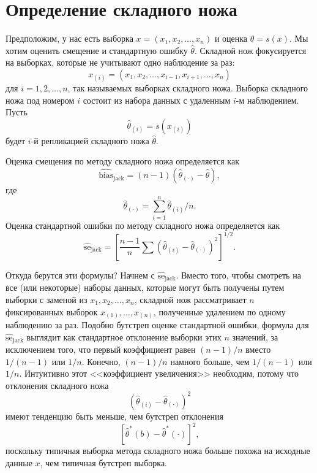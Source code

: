 \section{Определение складного ножа}

Предположим, у нас есть выборка $x = (x_1, x_2, \dots, x_n)$ и оценка $\hat{\theta} = s(x)$. Мы хотим оценить смещение и стандартную ошибку $\hat{\theta}$. Складной нож фокусируется на выборках, которые не учитывают одно наблюдение за раз:
\begin{equation}\label{eq11.1}
    x_{(i)} = (x_1, x_2, \dots, x_{i-1}, x_{i+1}, \dots, x_n)
\end{equation}
для $i = 1, 2, \dots, n$, так называемых выборках складного ножа. Выборка складного ножа под номером $i$ состоит из набора данных с удаленным $i$-м наблюдением. Пусть
\begin{equation}\label{eq11.2}
    \hat{\theta}_{(i)} = s(x_{(i)})
\end{equation}
будет $i$-й репликацией складного ножа $\hat{\theta}$.

Оценка смещения по методу складного ножа определяется как
\begin{equation}\label{eq11.3}
   \widehat{\text{bias}}_{\text{jack}} = (n-1)\left(\hat{\theta}_{(\cdot)} - \hat{\theta}\right),
\end{equation}
где
\begin{equation}\label{eq11.4}
   \hat{\theta}_{(\cdot)} = \sum\limits_{i=1}^{n}\hat{\theta}_{(i)}/n.
\end{equation}
Оценка стандартной ошибки по методу складного ножа определяется как
\begin{equation}\label{eq11.5}
   \widehat{\text{se}}_{\text{jack}} = \left[\frac{n-1}{n}\sum\left(\hat{\theta}_{(i)} - \hat{\theta}_{(\cdot)}\right)^{2}\right]^{1/2}.
\end{equation}

Откуда берутся эти формулы? Начнем с $\widehat{\text{se}}_{\text{jack}}$. Вместо того, чтобы смотреть на все (или некоторые) наборы данных, которые могут быть получены путем выборки с заменой из $x_1, x_2, \dots, x_n$, складной нож рассматривает $n$ фиксированных выборок $x_{(1)}, \dots, x_{(n)}$, полученные удалением по одному наблюдению за раз. Подобно бутстреп оценке стандартной ошибки, формула для $\widehat{\text{se}}_{\text{jack}}$ выглядит как стандартное отклонение выборки этих $n$ значений, за исключением того, что первый коэффициент равен $(n-1)/n$ вместо $1/(n-1)$ или $1/n$. Конечно, $(n-1)/n$ намного больше, чем $1/(n-1)$ или $1/n$. Интуитивно этот <<коэффициент увеличения>> необходим, потому что отклонения складного ножа
\begin{equation}\label{eq11.6}
   \left(\hat{\theta}_{(i)} - \hat{\theta}_{(\cdot)}\right)^{2}
\end{equation}
имеют тенденцию быть меньше, чем бутстреп отклонения
\begin{equation}\label{eq11.7}
   \left[\hat{\theta}^{*}(b) - \hat{\theta}^{*}(\cdot)\right]^{2},
\end{equation}
поскольку типичная выборка метода складного ножа больше похожа на исходные данные $x$, чем типичная бутстреп выборка.

